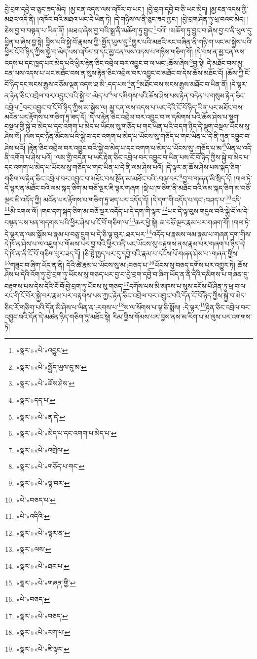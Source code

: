 བྱེ་བྲག་དབྱེ་བ་ཅུང་ཟད་མེད། །མྱ་ངན་འདས་ལས་འཁོར་བ་ཡང་། །བྱེ་བྲག་དབྱེ་བ་ཅི་ཡང་མེད། །མྱ་ངན་འདས་ཀྱི་མཐའ་འདི་ནི། །འཁོར་བའི་མཐའ་ཡང་དེ་ཡིན་ཏེ། །དེ་གཉིས་ལ་ནི་ཅུང་ཟད་ཀྱང་། །བྱེ་བྲག་ཤིན་ཏུ་ཕྲ་བའང་མེད། །ཅེས་བྱ་བ་བསྟན་པ་ཡིན་ནོ། །མཐའ་ཞེས་བྱ་བའི་སྒྲ་ནི་མཆོག་ཏུ་བྱུང་\footnote{«སྣར་»«པེ་»འབྱུང་}བའོ། །མཆོག་ཏུ་བྱུང་བ་ཞེས་བྱ་བ་ནི་ཕུལ་དུ་ཕྱིན་པ་ཞེས་བྱ་སྟེ། བྱིས་པའི་སྐྱེ་བོ་རྣམས་ཀྱི་:སྤྱོད་ཡུལ་དུ་\footnote{«སྣར་»«པེ་»སྤྱོད་ཡུལ་དུ་མ་}གྱུར་པའི་མཐའི་རང་བཞིན་ནི་གཉི་ག་ཡང་མ་སྐྱེས་པའི་ཕྱིར་ངོ་བོ་ཉིད་ཀྱིས་སྐྱེ་བ་མེད་པས་འཁོར་བ་དང་མྱ་ངན་ལས་འདས་པ་གཉིས་གཅིག་གོ། །དེ་བས་ན་མྱ་ངན་ལས་འདས་པ་དང་ཁྱད་པར་མེད་པའི་ཕྱིར་རྟེན་ཅིང་འབྲེལ་བར་འབྱུང་བ་ལ་ཡང་:ཆོས་ཞེས་\footnote{«སྣར་»«པེ་»ཆོས་ཤེས་}བྱ་སྟེ། དེ་མཐོང་བས་མྱ་ངན་ལས་འདས་པ་ཡང་མཐོང་བས་ན་སུས་རྟེན་ཅིང་འབྲེལ་བར་འབྱུང་བ་མཐོང་བ་དེས་ཆོས་མཐོང་ངོ། །ཆོས་ཀྱི་ངོ་བོ་ཉིད་དང་སངས་རྒྱས་བཅོམ་ལྡན་འདས་ཐ་མི་:དད་པས་\footnote{«སྣར་»དད་པ་}ན་\footnote{«སྣར་»«པེ་»ན་དེ་}མཐོང་བས་སངས་རྒྱས་མཐོང་བ་ཡིན་ནོ། །དེ་ལྟར་ན་རྟེན་ཅིང་འབྲེལ་བར་འབྱུང་བའི་སྐྱེ་བ་:མེད་པ་\footnote{«སྣར་»«པེ་»མེད་པ་དང་འགག་པ་མེད་པ་}ལ་དམིགས་པའི་ཆོས་ཤེས་པས་རྟེན་བདེན་པ་གསུམ་རྟེན་ཅིང་འབྲེལ་\footnote{«སྣར་»«པེ་»འགྲེལ་}བར་འབྱུང་བ་ངོ་བོ་ཉིད་ཀྱིས་མ་སྐྱེས་ལ། མྱ་ངན་ལས་འདས་པ་ཡང་དེའི་ངོ་བོ་ཉིད་ཡིན་པར་མཐོང་བས་མངོན་པར་རྟོགས་པ་གཅིག་ཏུ་ཟད་དོ། །དེ་ལ་རྟེན་ཅིང་འབྲེལ་བར་འབྱུང་བ་ལ་དམིགས་པའི་ཆོས་ཤེས་པ་སྡུག་བསྔལ་གྱི་སྐྱེ་བ་མེད་པ་དང་འགག་པ་མེད་པ་ཡོངས་སུ་གཅོད་པ་གང་ཡིན་པའི་བདག་ཉིད་དེ་སྡུག་བསྔལ་ཡོངས་སུ་ཤེས་སོ། །ལས་དང་ཉོན་མོངས་པའི་སྐྱེ་བ་དང་འགག་པ་མེད་པ་ཡོངས་སུ་གཅོད་པ་གང་ཡིན་པ་དེ་ནི་ཀུན་འབྱུང་བ་ཤེས་པའོ། །རྟེན་ཅིང་འབྲེལ་བར་འབྱུང་བའི་སྐྱེ་བ་མེད་པ་དང་འགག་པ་མེད་པ་ཡོངས་སུ་:གཅོད་པ་མ་\footnote{«སྣར་»«པེ་»གཅོད་པ་གང་}ཡིན་པ་འདི་ནི་འགོག་པ་ཤེས་པའོ། །ལམ་གྱི་བདེན་པ་ཡང་རྟེན་ཅིང་འབྲེལ་བར་འབྱུང་བ་ཡིན་པས་ངོ་བོ་ཉིད་ཀྱིས་སྐྱེ་བ་མེད་པ་དང་འགག་པ་མེད་པ་ཡོངས་སུ་གཅོད་པ་གང་ཡིན་པ་དེ་ནི་ལམ་ཤེས་པའོ། །དེ་ལྟར་ན་ཆོས་ཤེས་པས་སྐད་ཅིག་གཅིག་ལ་རྟེན་ཅིང་འབྲེལ་བར་འབྱུང་བ་མཐོང་བས་སྔོན་མ་མཐོང་བའི་:བལྟ་བར་\footnote{«སྣར་»«པེ་»ལྟ་བར་}བྱ་བ་གཞན་མི་སྲིད་དོ། །གལ་ཏེ་དེ་ལྟར་ན་མཐོང་བའི་ལམ་སྐད་ཅིག་མ་བཅོ་ལྔར་ཇི་ལྟར་གཞག །སྡེ་པ་ཁ་ཅིག་ནི་མཐོང་བའི་ལམ་སྐད་ཅིག་མ་བཅོ་ལྔར་མི་འདོད་ཀྱི། མངོན་པར་རྟོགས་པ་གཅིག་ཏུ་ཟད་པར་འདོད་དོ། །དེ་དག་གི་འདོད་པ་དང་:བཤད་པ་\footnote{«པེ་»བཅད་པ་}འདི་\footnote{«པེ་»འདིའི་}མི་འགལ་ལོ། །གང་དག་སྐད་ཅིག་མ་བཅོ་ལྔར་འདོད་པ་དེ་དག་གི་ལྟར་\footnote{«སྣར་»«པེ་»ལྟར་ན་}ཡང་དེ་ལྟ་བུས་གདུལ་བའི་སྐྱེ་བོ་ལ་དེ་བསྟན་པས་ཕན་གདགས་པའི་ཕྱིར་ཤེས་པ་ངོ་བོ་གཅིག་ལ་\footnote{«སྣར་»ལས་}ཆར་ཕྱེ་སྟེ། ཆ་བཅོ་ལྔར་རྣམ་པར་གཞག་གོ། །གལ་ཏེ་དེ་ལྟར་ན་ལམ་སྒོམ་པ་རྣམ་པ་བཅུ་དྲུག་པ་དེ་ཅི་ལྟ་བུར་:ཐར་པར་\footnote{«སྣར་»«པེ་»ཐར་པ་}འདོད་པ་རྣམས་ལམ་རྣམ་པ་གཞན་དག་གིས་དེ་ཁོ་ན་ཤེས་པ་ལ་འཇུག་པ་གོམས་པར་བྱ་བའི་ཕྱིར་འདི་ཡང་ཡོངས་སུ་བརྟགས་ནས་རྣམ་པར་གཞག་པ་ཉིད་དེ། དེ་ཁོ་ན་ནི་ངོ་བོ་གཅིག་པུར་ཟད་དོ། །ཅི་སྟེ་ཁྱད་པར་དུ་དབྱེ་བའི་རྣམ་པ་དངོས་པོ་གཞན་ཤེས་པ་:གཞན་གྱིས་\footnote{«སྣར་»«པེ་»གཞན་གྱི་}གཟུང་བ་ཞིག་ཡོད་ན་ནི། དེའི་ཚེ་རྣམ་པ་ཡོངས་སུ་མ་:བཅད་པ་\footnote{«པེ་»བཅད་}ཡོངས་སུ་བཅད་དགོས་པར་འགྱུར་ཏེ། ཆོས་ཤེས་པ་དེའི་འོག་ཏུ་བྱེ་བྲག་ཏུ་ཡོངས་སུ་གཅད་པར་བྱ་བ་བྱེ་བྲག་དབྱེ་བ་ཞིག་ཡོད་ན་ནི་དེའི་དམིགས་པ་གཞན་དུ་བརྟགས་པས་དེས་དེའི་ངོ་བོ་བྱེ་བྲག་ཏུ་ཡོངས་སུ་གཅད་\footnote{«སྣར་»«པེ་»བཅད་}དགོས་པས་མི་མཁས་པ་སུས་དངོས་པོ་ཤིན་ཏུ་ཕྲ་བ་ལ་རང་གི་ངོ་བོར་སྐྱེ་བར་རྣམ་པར་བརྟགས་པས་ཀྱང་རྟེན་ཅིང་འབྲེལ་བར་འབྱུང་བའི་དོན་ངོ་བོ་ཉིད་ཀྱིས་སྐྱེ་བ་མེད་ཅིང་རོ་གཅིག་པའི་དོན་མི་ཤེས་པ་ཡིན་ན་:རགས་པ་\footnote{«སྣར་»«པེ་»རག་པ་}ས་ལ་སོགས་པ་ལྟ་ཅི་སྨོས། :དེ་ལྟར་\footnote{«སྣར་»«པེ་»ཇི་ལྟར་}རྟེན་ཅིང་འབྲེལ་བར་འབྱུང་བའི་དོན་དེ་མཚན་ཉིད་གཅིག་ཏུ་མཐོང་སྟེ། རིམ་གྱིས་གོམས་པར་བྱས་ནས་མ་རིག་པ་མ་ལུས་པར་འགགས་ཏེ། 